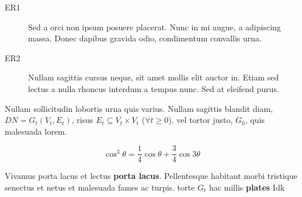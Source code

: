 \documentclass[a0paper,portrait]{baposter}
\begin{document}
\begin{poster}
{\begin{description}
\item[ER1] Sed a orci non ipsum posuere placerat. Nunc in mi augue, a adipiscing massa. Donec dapibus gravida odio, condimentum convallis urna.\item[ER2] Nullam sagittis cursus neque, sit amet mollis elit auctor in. Etiam sed lectus a nulla rhoncus interdum a tempus nunc. Sed at eleifend purus.
\end{description}

Nullam sollicitudin lobortis urna quis varius. Nullam sagittis blandit diam, $DN = G_t(V_t,E_t)$, risus $E_t \subseteq V_t \times V_t$ ($\forall t \geq 0$). vel tortor justo, $G_0$, quis malesuada lorem.

\begin{equation}
\cos^3 \theta =\frac{1}{4}\cos\theta+\frac{3}{4}\cos 3\theta
\label{eq:refname}
\end{equation}

Vivamus porta lacus et lectus \textbf{porta lacus}. Pellentesque habitant morbi tristique senectus et netus et malesuada fames ac turpis. torte $G_t$ hac millis \textbf{plates} Idk 
}





\end{poster}
\end{document}
